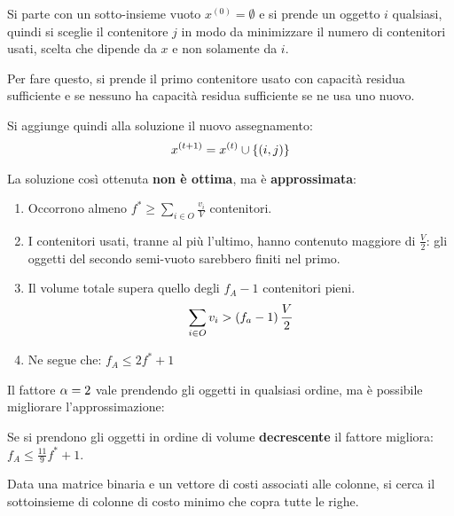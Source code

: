 \documentclass[\main/main.tex]{subfiles}
\begin{document}
\begin{multicols}{2}
\begin{definition}
    Si parte con un sotto-insieme vuoto \(x^{(0)} = \emptyset\) e si prende un oggetto \(i\) qualsiasi, quindi si sceglie il contenitore \(j\)  in modo da minimizzare il numero di contenitori usati, scelta che dipende da \(x\) e non solamente da \(i\).
    
    Per fare questo, si prende il primo contenitore usato con capacità residua sufficiente e se nessuno ha capacità residua sufficiente se ne usa uno nuovo.
    
    Si aggiunge quindi alla soluzione il nuovo assegnamento:
    \[
        x^{(t+1)} = x^{(t)} \cup \left\{\left(i,j\right)\right\}
    \]
\end{definition}
\begin{analysis}
    La soluzione così ottenuta \textbf{non è ottima}, ma è \textbf{approssimata}:
    \begin{enumerate}
        \item Occorrono almeno \(f^*\geq \sum_{i \in O} \frac{v_i}{V}\) contenitori.
        \item I contenitori usati, tranne al più l'ultimo, hanno contenuto maggiore di \(\frac{V}{2}\): gli oggetti del secondo semi-vuoto sarebbero finiti nel primo.
        \item Il volume totale supera quello degli \(f_A -1 \) contenitori pieni.
        \[
            \sum_{i \in O} v_i > \left(f_a - 1\right) \frac{V}{2}
        \]
        \item Ne segue che: \(f_A \leq 2f^* + 1\)
    \end{enumerate}
\end{analysis}
\begin{observation}
    Il fattore \(\alpha = 2\) vale prendendo gli oggetti in qualsiasi ordine, ma è possibile migliorare l'approssimazione:
    
    Se si prendono gli oggetti in ordine di volume \textbf{decrescente} il fattore migliora: \(f_A \leq \frac{11}{9}f^* + 1\).
\end{observation}
\begin{definition}
    Data una matrice binaria e un vettore di costi associati alle colonne, si cerca il sottoinsieme di colonne di costo minimo che copra tutte le righe.
    

\end{definition}
\end{multicols}
\end{document}
